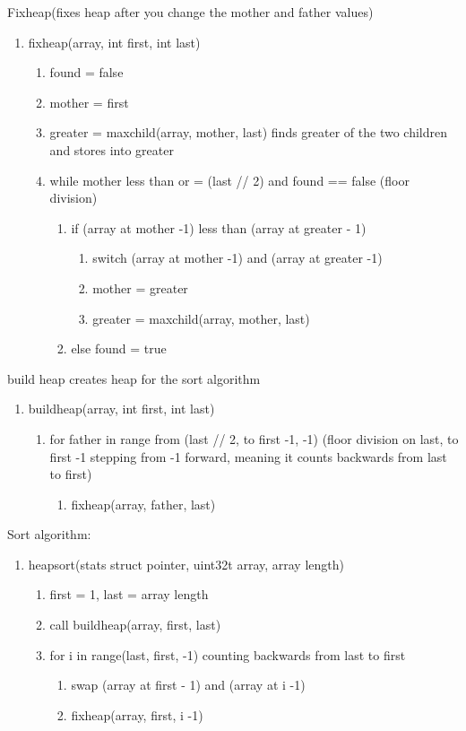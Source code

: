 \documentclass[11pt]{article}
\begin{document}
Fixheap(fixes heap after you change the mother and father values)
\begin{enumerate}
\item fixheap(array, int first, int last)
	\begin{enumerate}
	\item found = false
	\item mother = first
	\item greater = maxchild(array, mother, last)  finds greater of the two children and stores into greater
	\item while mother less than or = (last // 2) and found == false (floor division)
		\begin{enumerate}
		\item if (array at mother -1) less than (array at greater - 1)
			\begin{enumerate}
			\item switch (array at mother -1) and (array at greater -1)
			\item mother = greater
			\item greater = maxchild(array, mother, last)
			\end{enumerate}
		\item else found = true
		\end{enumerate}
	\end{enumerate}
\end{enumerate}

build heap creates heap for the sort algorithm
\begin{enumerate}
\item buildheap(array, int first, int last)
	\begin{enumerate}
		\item for father in range from (last // 2, to first -1, -1)  (floor division on last, to first -1 stepping from -1 forward, meaning it counts backwards from last to first)
		\begin{enumerate}
		\item fixheap(array, father, last)
		\end{enumerate}
	\end{enumerate}
\end{enumerate}

Sort algorithm:
\begin{enumerate}
\item heapsort(stats struct pointer, uint32t array, array length)
	\begin{enumerate}
	\item first = 1, last = array length
	\item call buildheap(array, first, last)
	\item for i in range(last, first, -1)  counting backwards from last to first
		\begin{enumerate}
		\item swap (array at first - 1) and (array at i -1)
		\item fixheap(array, first, i -1)
		\end{enumerate}
	\end{enumerate}
\end{enumerate}
\end{document}
